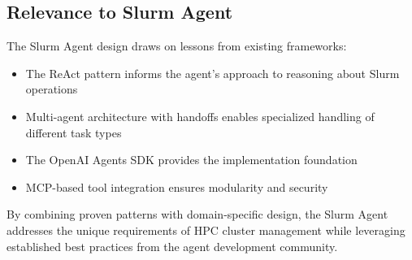 \subsection{Relevance to Slurm Agent}

The Slurm Agent design draws on lessons from existing frameworks:
\begin{itemize}
    \item The ReAct pattern informs the agent's approach to reasoning about Slurm operations
    \item Multi-agent architecture with handoffs enables specialized handling of different task types
    \item The OpenAI Agents SDK provides the implementation foundation
    \item MCP-based tool integration ensures modularity and security
\end{itemize}

By combining proven patterns with domain-specific design, the Slurm Agent addresses the unique requirements of HPC cluster management while leveraging established best practices from the agent development community.
